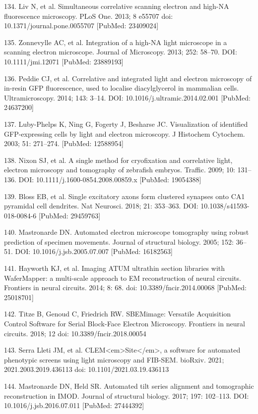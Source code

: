 \documentclass{article}
\begin{document}
\begin{hangpars}
134. Liv N, et al. Simultaneous correlative scanning electron and high-NA fluorescence microscopy. PLoS One. 2013; 8 e55707 doi: 10.1371/journal.pone.0055707 [PubMed: 23409024]

135. Zonnevylle AC, et al. Integration of a high-NA light microscope in a scanning electron microscope. Journal of Microscopy. 2013; 252: 58–70. DOI: 10.1111/jmi.12071 [PubMed: 23889193]

136. Peddie CJ, et al. Correlative and integrated light and electron microscopy of in-resin GFP fluorescence, used to localise diacylglycerol in mammalian cells. Ultramicroscopy. 2014; 143: 3–14. DOI: 10.1016/j.ultramic.2014.02.001 [PubMed: 24637200]

137. Luby-Phelps K, Ning G, Fogerty J, Besharse JC. Visualization of identified GFP-expressing cells by light and electron microscopy. J Histochem Cytochem. 2003; 51: 271–274. [PubMed: 12588954]

138. Nixon SJ, et al. A single method for cryofixation and correlative light, electron microscopy and tomography of zebrafish embryos. Traffic. 2009; 10: 131–136. DOI: 10.1111/j.1600-0854.2008.00859.x [PubMed: 19054388]

139. Bloss EB, et al. Single excitatory axons form clustered synapses onto CA1 pyramidal cell dendrites. Nat Neurosci. 2018; 21: 353–363. DOI: 10.1038/s41593-018-0084-6 [PubMed: 29459763]

140. Mastronarde DN. Automated electron microscope tomography using robust prediction of specimen movements. Journal of structural biology. 2005; 152: 36–51. DOI: 10.1016/j.jsb.2005.07.007 [PubMed: 16182563]

141. Hayworth KJ, et al. Imaging ATUM ultrathin section libraries with WaferMapper: a multi-scale approach to EM reconstruction of neural circuits. Frontiers in neural circuits. 2014; 8: 68. doi: 10.3389/fncir.2014.00068 [PubMed: 25018701]

142. Titze B, Genoud C, Friedrich RW. SBEMimage: Versatile Acquisition Control Software for Serial Block-Face Electron Microscopy. Frontiers in neural circuits. 2018; 12 doi: 10.3389/fncir.2018.00054

143. Serra Lleti JM, et al. CLEM<em>Site</em>, a software for automated phenotypic screens using light microscopy and FIB-SEM. bioRxiv. 2021; 2021.2003.2019.436113 doi: 10.1101/2021.03.19.436113

144. Mastronarde DN, Held SR. Automated tilt series alignment and tomographic reconstruction in IMOD. Journal of structural biology. 2017; 197: 102–113. DOI: 10.1016/j.jsb.2016.07.011 [PubMed: 27444392]


\end{hangpars}
\end{document}
